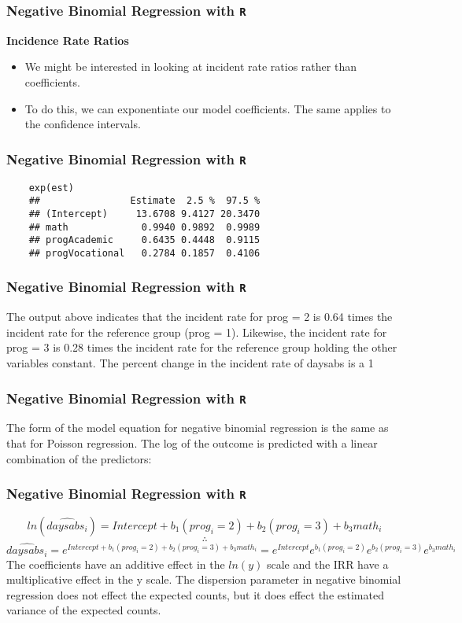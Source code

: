 \documentclass[00-GLMregslides.tex]{subfiles}
\begin{document}
\begin{frame}[fragile]
	\frametitle{Negative Binomial Regression with \texttt{R} }
	\Large
\textbf{Incidence Rate Ratios}
\begin{itemize}
\item	We might be interested in looking at incident rate ratios rather than coefficients. 
\item To do this, we can exponentiate our model coefficients. The same applies to the confidence intervals.
\end{itemize}
\end{frame}
\begin{frame}[fragile]
	\frametitle{Negative Binomial Regression with \texttt{R} }
	\Large
	\begin{verbatim}	
	exp(est)
	##                Estimate  2.5 %  97.5 %
	## (Intercept)     13.6708 9.4127 20.3470
	## math             0.9940 0.9892  0.9989
	## progAcademic     0.6435 0.4448  0.9115
	## progVocational   0.2784 0.1857  0.4106
	\end{verbatim}
\end{frame}
\begin{frame}[fragile]
	\frametitle{Negative Binomial Regression with \texttt{R} }
	\Large
	
	The output above indicates that the incident rate for prog = 2 is 0.64 times the incident rate for the reference group (prog = 1). Likewise, the incident rate for prog = 3 is 0.28 times the incident rate for the reference group holding the other variables constant. The percent change in the incident rate of daysabs is a 1%
\end{frame}
\begin{frame}[fragile]
	\frametitle{Negative Binomial Regression with \texttt{R} }
	\Large
	
	The form of the model equation for negative binomial regression is the same as that for Poisson regression. The log of the outcome is predicted with a linear combination of the predictors:
\end{frame}
\begin{frame}[fragile]
	\frametitle{Negative Binomial Regression with \texttt{R} }
	\Large
	
	\[ ln(\widehat{daysabs_i}) = Intercept + b_1(prog_i = 2) + b_2(prog_i = 3) + b_3math_i \] \[ \therefore \] \[ \widehat{daysabs_i} = e^{Intercept + b_1(prog_i = 2) + b_2(prog_i = 3) + b_3math_i} = e^{Intercept}e^{b_1(prog_i = 2)}e^{b_2(prog_i = 3)}e^{b_3math_i} \]
	The coefficients have an additive effect in the \(ln(y)\) scale and the IRR have a multiplicative effect 
	in the y scale. The dispersion parameter in negative binomial regression does not effect the expected counts, 
	but it does effect the estimated variance of the expected counts. 
	\end{frame}
\end{document}

